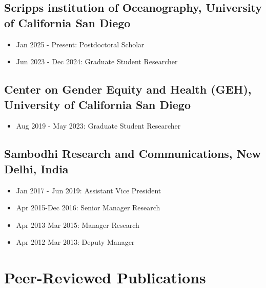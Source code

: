 \documentclass[11pt,letterpaper]{article}
\begin{document}
\subsection*{Scripps institution of Oceanography, University of California San Diego}
\label{sec:orgf34ac87}
\begin{itemize}
\item Jan 2025 - Present: Postdoctoral Scholar
\item Jun 2023 - Dec 2024: Graduate Student Researcher 
\end{itemize}
\subsection*{Center on Gender Equity and Health (GEH), University of California San Diego}
\label{sec:org0c057ac}
\begin{itemize}
\item Aug 2019 - May 2023: Graduate Student Researcher 
\end{itemize}
\subsection*{Sambodhi Research and Communications, New Delhi, India}
\label{sec:org7491709}
\begin{itemize}
\item Jan 2017 - Jun 2019: Assistant Vice President
\item Apr 2015-Dec 2016: Senior Manager Research
\item Apr 2013-Mar 2015: Manager Research
\item Apr 2012-Mar 2013: Deputy Manager
\end{itemize}
\section*{Peer-Reviewed Publications}
\label{sec:orgf1e74d2}
\end{document}
